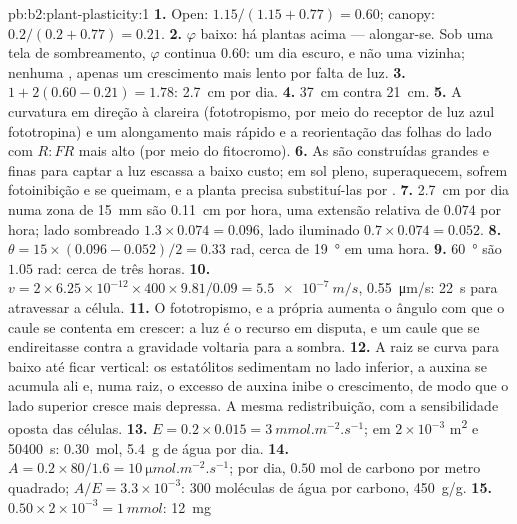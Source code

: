\begin{solution}{pb:b2:plant-plasticity:1}
\textbf{1.} Open: $1.15/(1.15 + 0.77) = 0.60$; canopy: $0.2/(0.2 +
0.77) = 0.21$.
\textbf{2.} $\varphi$ baixo: há plantas acima --- alongar-se. Sob uma
tela de sombreamento, $\varphi$ continua $0.60$: um dia escuro, e não
uma vizinha; nenhuma , apenas um crescimento mais
lento por falta de luz.
\textbf{3.} $1 + 2(0.60 - 0.21) = 1.78$: \qty{2.7}{cm} por dia.
\textbf{4.} \qty{37}{cm} contra \qty{21}{cm}.
\textbf{5.} A curvatura em direção à clareira (fototropismo, por meio do
receptor de luz azul fototropina) e um alongamento mais rápido e a
reorientação das folhas do lado com $R{:}FR$ mais alto (por meio do
fitocromo).
\textbf{6.} As  são construídas grandes e finas para
captar a luz escassa a baixo custo; em sol pleno, superaquecem, sofrem
fotoinibição e se queimam, e a planta precisa substituí-las por .
\textbf{7.} \qty{2.7}{cm} por dia numa zona de \qty{15}{mm} são
\qty{0.11}{cm} por hora, uma extensão relativa de $0.074$ por hora;
lado sombreado $1.3\times 0.074 = 0.096$, lado iluminado
$0.7\times 0.074 =
0.052$.
\textbf{8.} $\theta = 15\times(0.096 - 0.052)/2 = 0.33$ rad, cerca de
\qty{19}{\degree} em uma hora.
\textbf{9.} \qty{60}{\degree} são $1.05$ rad: cerca de três horas.
\textbf{10.} $v = 2\times 6.25\times 10^{-12}\times 400\times
9.81/0.09 = \qty{5.5e-7}{m/s}$, \qty{0.55}{\micro m/s}: \qty{22}{s}
para atravessar a célula.
\textbf{11.} O fototropismo, e a própria  aumenta o
ângulo com que o caule se contenta em crescer: a luz é o recurso em
disputa, e um caule que se endireitasse contra a gravidade voltaria
para a sombra.
\textbf{12.} A raiz se curva para baixo até ficar vertical: os
estatólitos sedimentam no lado inferior, a auxina se acumula ali e, numa
raiz, o excesso de auxina inibe o crescimento, de modo que o lado
superior cresce mais depressa. A mesma redistribuição, com a
sensibilidade oposta das células.
\textbf{13.} $E = 0.2\times 0.015 = \qty{3}{mmol.m^{-2}.s^{-1}}$; em
$2\times 10^{-3}$ \unit{m^2} e \qty{50400}{s}: \qty{0.30}{mol},
\qty{5.4}{g} de água por dia.
\textbf{14.} $A = 0.2\times 80/1.6 = \qty{10}{\micro mol.m^{-2}.s^{-1}}$;
por dia, $0.50$ mol de carbono por metro quadrado; $A/E = 3.3\times
10^{-3}$: 300 moléculas de água por carbono, \qty{450}{g/g}.
\textbf{15.} $0.50\times 2\times 10^{-3} = \qty{1}{mmol}$: \qty{12}{mg}

\end{solution}
